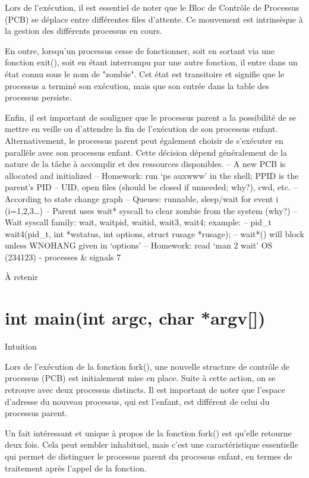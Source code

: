\documentclass[12pt]{article}
\begin{document}
Lors de l'exécution, il est essentiel de noter que le Bloc de Contrôle de Processus (PCB) se déplace entre différentes files d'attente. Ce mouvement est intrinsèque à la gestion des différents processus en cours. 

En outre, lorsqu'un processus cesse de fonctionner, soit en sortant via une fonction exit(), soit en étant interrompu par une autre fonction, il entre dans un état connu sous le nom de "zombie". Cet état est transitoire et signifie que le processus a terminé son exécution, mais que son entrée dans la table des processus persiste.

Enfin, il est important de souligner que le processus parent a la possibilité de se mettre en veille ou d'attendre la fin de l'exécution de son processus enfant. Alternativement, le processus parent peut également choisir de s'exécuter en parallèle avec son processus enfant. Cette décision dépend généralement de la nature de la tâche à accomplir et des ressources disponibles.
– A new PCB is allocated and initialized
– Homework: run ‘ps auxwww’ in the shell; PPID is the parent’s PID
– UID, open files (should be closed if unneeded; why?), cwd, etc.
– According to state change graph
– Queues: runnable, sleep/wait for event i (i=1,2,3…)
– Parent uses wait* syscall to clear zombie from the system (why?)
– Wait syscall family: wait, waitpid, waitid, wait3, wait4; example:
– pid\_t wait4(pid\_t, int *wstatus, int options, struct rusage *rusage);
– wait*() will block unless WNOHANG given in ‘options’
– Homework: read ‘man 2 wait’
OS (234123) - processes \& signals
7
\begin{aretenir}{À retenir}
\end{aretenir}

\section{int main(int argc, char *argv[])}
\begin{myvulga}{Intuition}
\end{myvulga}
Lors de l'exécution de la fonction fork(), une nouvelle structure de contrôle de processus (PCB) est initialement mise en place. Suite à cette action, on se retrouve avec deux processus distincts. Il est important de noter que l'espace d'adresse du nouveau processus, qui est l'enfant, est différent de celui du processus parent. 

Un fait intéressant et unique à propos de la fonction fork() est qu'elle retourne deux fois. Cela peut sembler inhabituel, mais c'est une caractéristique essentielle qui permet de distinguer le processus parent du processus enfant, en termes de traitement après l'appel de la fonction.
\end{document}
